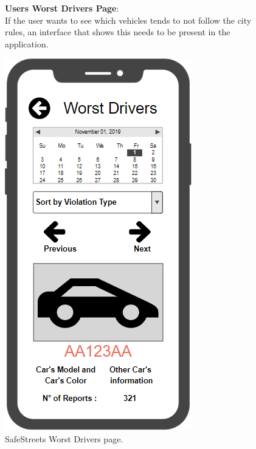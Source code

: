 \begin{figure}
	\begin{flushleft}
		\textbf{Users Worst Drivers Page}:\\
		If the user wants to see which vehicles tends to not follow the city rules, an interface that shows this needs to be present in the application.
	\end{flushleft}
	\centering
	\includegraphics[width=0.6\linewidth]{../RASD/images/mockups/vehicles}
	\caption{SafeStreets Worst Drivers page.}
	\label{fig:vehicles}
\end{figure}
\clearpage

